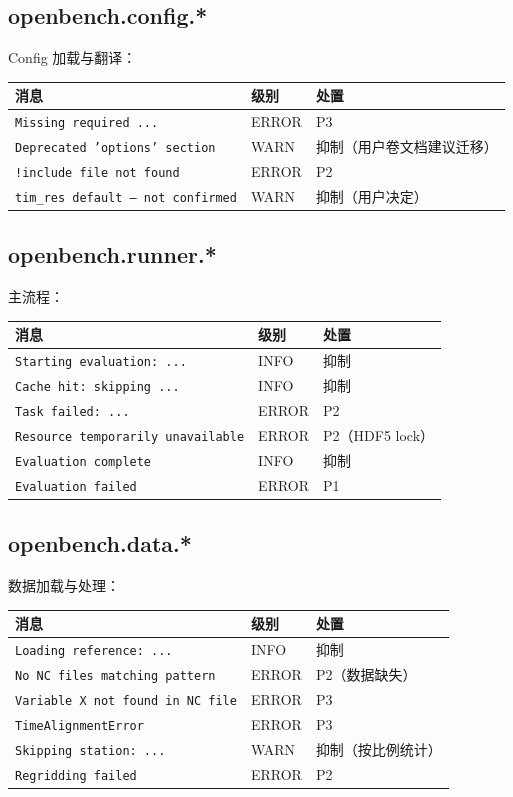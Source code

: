 \subsection{openbench.config.*}

Config 加载与翻译：

\begin{longtable}{p{6cm} p{2cm} p{4cm}}
  \toprule
  消息 & 级别 & 处置 \\
  \midrule
  \endhead
  \texttt{Missing required ...} & ERROR & P3 \\
  \texttt{Deprecated 'options' section} & WARN & 抑制（用户卷文档建议迁移） \\
  \texttt{!include file not found} & ERROR & P2 \\
  \texttt{tim\_res default — not confirmed} & WARN & 抑制（用户决定） \\
  \bottomrule
\end{longtable}

\subsection{openbench.runner.*}

主流程：

\begin{longtable}{p{6cm} p{2cm} p{4cm}}
  \toprule
  消息 & 级别 & 处置 \\
  \midrule
  \endhead
  \texttt{Starting evaluation: ...} & INFO & 抑制 \\
  \texttt{Cache hit: skipping ...} & INFO & 抑制 \\
  \texttt{Task failed: ...} & ERROR & P2 \\
  \texttt{Resource temporarily unavailable} & ERROR & P2（HDF5 lock） \\
  \texttt{Evaluation complete} & INFO & 抑制 \\
  \texttt{Evaluation failed} & ERROR & P1 \\
  \bottomrule
\end{longtable}

\subsection{openbench.data.*}

数据加载与处理：

\begin{longtable}{p{6cm} p{2cm} p{4cm}}
  \toprule
  消息 & 级别 & 处置 \\
  \midrule
  \endhead
  \texttt{Loading reference: ...} & INFO & 抑制 \\
  \texttt{No NC files matching pattern} & ERROR & P2（数据缺失） \\
  \texttt{Variable X not found in NC file} & ERROR & P3 \\
  \texttt{TimeAlignmentError} & ERROR & P3 \\
  \texttt{Skipping station: ...} & WARN & 抑制（按比例统计） \\
  \texttt{Regridding failed} & ERROR & P2 \\
  \bottomrule
\end{longtable}

